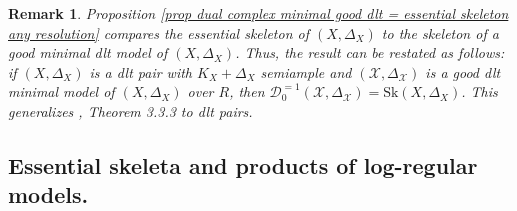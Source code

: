 \documentclass{amsart}%
\numberwithin{equation}{subsection}
\theoremstyle{plain2}
\theoremstyle{definition2}
\newtheorem{rem}[equation]{Remark}
\theoremstyle{stepstyle}
\theoremstyle{point}
\theoremstyle{subpoint}
\newcommand{\cX}{\ensuremath{\mathscr{X}}}
\newcommand{\Sk}{\mathrm{Sk}}
\begin{document}
\begin{rem}
Proposition \ref{prop dual complex minimal good dlt = essential skeleton any resolution} compares the essential skeleton of $(X,\Delta_X)$ to the skeleton of a good minimal dlt model of $(X,\Delta_X)$. Thus, the result can be restated as follows: if $(X,\Delta_X)$ is a dlt pair with $K_X+\Delta_X$ semiample and $(\cX,\Delta_\cX)$ is a good dlt minimal model of $(X,\Delta_X)$ over $R$, then $\mathcal{D}_0^{=1}(\cX, \Delta_\cX) = \Sk(X,\Delta_X)$. This generalizes \cite{NicaiseXu}, Theorem 3.3.3 to dlt pairs.
\end{rem}

\subsection{Essential skeleta and products of log-regular models.}
\end{document}
